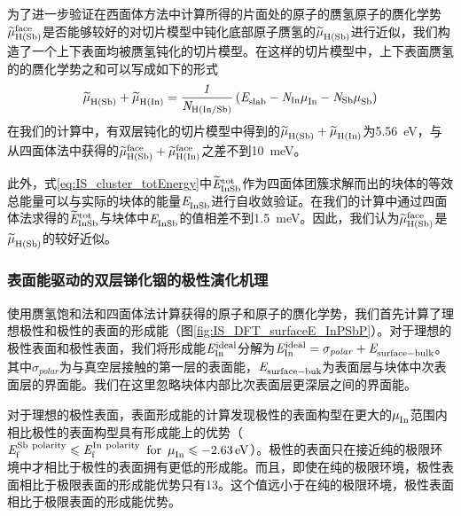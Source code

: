 为了进一步验证在西面体方法中计算所得的片面处的原子的赝氢原子的赝化学势$\it \widetilde{\mu}_{\rm H\left(Sb\right)}^{\rm face} \it$是否能够较好的对切片模型中钝化底部原子赝氢的$\it \widetilde{\mu}_{\rm H\left(Sb\right)}^{\rm } \it$进行近似，我们构造了一个上下表面均被赝氢钝化的切片模型。在这样的切片模型中，上下表面赝氢的的赝化学势之和可以写成如下的形式\chinesecolon
\[
    \it \widetilde{\mu}_{\rm H\left(Sb\right)}^{\rm } \it+\it \widetilde{\mu}_{\rm H\left(In\right)}^{\rm } \it=\frac{1}{N_{\rm H \left(In/ Sb\right)}} \left(\it E_{\rm slab}^{\rm } \it-N_{\rm In}\it \mu_{\rm In}^{\rm } \it-N_{\rm Sb}\it \mu_{\rm Sb}^{\rm } \it\right)
    \]
在我们的计算中，有双层钝化的切片模型中得到的$\it \widetilde{\mu}_{\rm H\left(Sb\right)}^{\rm } \it+\it \widetilde{\mu}_{\rm H\left(In\right)}^{\rm } \it$为\SI{5.56}{\electronvolt}，与从四面体法中获得的$\it \widetilde{\mu}_{\rm H\left(Sb\right)}^{\rm face} \it+\it \widetilde{\mu}_{\rm H\left(In\right)}^{\rm face} \it$之差不到\SI{10}{\milli\electronvolt}。

此外，式\ref{eq:IS_cluster_totEnergy}中$\it \widetilde{E}_{\rm InSb}^{\rm tot} \it$作为四面体团簇求解而出的块体的等效总能量可以与实际的块体的能量$\it E_{\rm InSb}^{\rm } \it$进行自收敛验证。在我们的计算中通过四面体法求得的$\it \widetilde{E}_{\rm InSb}^{\rm tot} \it$与块体中$\it E_{\rm InSb}^{\rm } \it$的值相差不到\SI{1.5}{\milli\electronvolt}。因此，我们认为$\it \widetilde{\mu}_{\rm H\left(Sb\right)}^{\rm face} \it$是$\it \widetilde{\mu}_{\rm H\left(Sb\right)}^{\rm } \it$的较好近似。

\subsubsection{表面能驱动的双层锑化铟的极性演化机理}
使用赝氢饱和法和四面体法计算获得的原子和原子的赝化学势，我们首先计算了理想极性和极性的表面的形成能（图\ref{fig:IS_DFT_surfaceE_InPSbP}）。对于理想的极性表面和极性表面，我们将形成能$\it E_{\rm In}^{\rm ideal} \it$分解为$\it E_{\rm In}^{\rm ideal} \it=\sigma _{polar}+\it E_{\rm surface-bulk}^{\rm } \it$。其中$\sigma _{polar}$为与真空层接触的第一层的表面能，$\it E_{\rm surface-buk}^{\rm } \it$为表面层与块体中次表面层的界面能。我们在这里忽略块体内部比次表面层更深层之间的界面能。

对于理想的极性表面，表面形成能的计算发现极性的表面构型在更大的$\it \mu_{\rm In}^{\rm } \it$范围内相比极性的表面构型具有形成能上的优势（$\it E_{\rm f}^{\rm Sb\ polarity} \it \leqslant \it E_{\rm f}^{\rm In\ polarity} \it\enspace \rm{for} \enspace \it \mu_{\rm In}^{\rm } \it \leqslant \SI{-2.63}{\electronvolt}$）。极性的表面只在接近纯的极限环境中才相比于极性的表面拥有更低的形成能。而且，即使在纯的极限环境，极性表面相比于极限表面的形成能优势只有\SI{13}{\mievpas}。这个值远小于在纯的极限环境，极性表面相比于极限表面的形成能优势。

